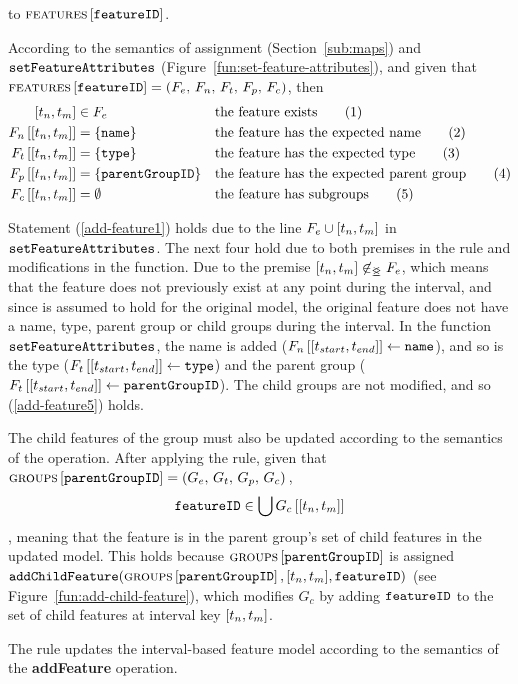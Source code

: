 to $\textsc{features} \left[ \texttt{featureID} \right]$. 

According to the semantics of assignment (Section~\vref{sub:maps}) and $\texttt{setFeatureAttributes}$ (Figure~\vref{fun:set-feature-attributes}), and given that $\textsc{features} \left[ \texttt{featureID} \right] = \left(F_e,\, F_n,\, F_t,\, F_p,\, F_c\right)$, then 
\begin{align}
   \interval{t_n}{t_m} &\in F_e && \text{the feature exists} \tag{1} \label{add-feature1}\\
   \lookup{F_n}{\interval{t_n}{t_m}} &= \set{\var{name}} && \text{the feature has the expected name} \tag{2} \label{add-feature2}\\
   \lookup{F_t}{\interval{t_n}{t_m}} &= \set{\var{type}}  && \text{the feature has the expected type} \tag{3} \label{add-feature3}\\
   \lookup{F_p}{\interval{t_n}{t_m}} &= \set{\var{parentGroupID}}  && \text{the feature has the expected parent group} \tag{4} \label{add-feature4}\\
   \lookup{F_c}{\interval{t_n}{t_m}} &= \emptyset && \text{the feature has subgroups} \tag{5} \label{add-feature5}
\end{align}

Statement (\ref{add-feature1}) holds due to the line $F_e \cup \interval{t_n}{t_m}$ in $\texttt{setFeatureAttributes}$. The next four hold due to both premises in the rule and modifications in the function. Due to the premise $\interval{t_n}{t_m} \not \innr F_e$, which means that the feature does not previously exist at any point during the interval, and since  is assumed to hold for the original model, the original feature does not have a name, type, parent group or child groups during the interval. In the function $\texttt{setFeatureAttributes}$, the name is added ($\lookup{F_n}{\interval{t_{start}}{t_{end}}} \assign \var{name}$), and so is the type ($\lookup{F_t}{\interval{t_{start}}{t_{end}}} \assign \var{type}$) and the parent group ($\lookup{F_t}{\interval{t_{start}}{t_{end}}} \assign \var{parentGroupID}$). The child groups are not modified, and so (\ref{add-feature5}) holds.

The child features of the group must also be updated according to the semantics of the operation. After applying the rule, given that $\textsc{groups}{} \left[ \texttt{parentGroupID} \right] = \left(G_e,\, G_t,\, G_p,\, G_c\right){}$, 
\[
   \var{featureID} \in \bigcup \lookup{G_c}{\interval{t_n}{t_m}}
\]
, meaning that the feature is in the parent group's set of child features in the updated model. This holds because $\textsc{groups}{} \left[ \texttt{parentGroupID} \right]$ is assigned $\var{addChildFeature}(\lookup{\groups}{\var{parentGroupID}}, \interval{t_n}{t_m}, \var{featureID})$ (see Figure~\vref{fun:add-child-feature}), which modifies $G_c$ by adding $\texttt{featureID}$ to the set of child features at interval key $\interval{t_n}{t_m}$.
\\

\begin{lemma}
   The  rule updates the interval-based feature model according to the semantics of the \textbf{addFeature} operation.
   \label{lemma:add-feature-mod}
\end{lemma}


